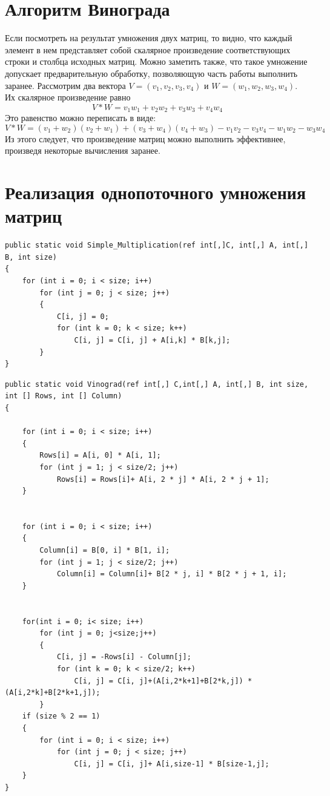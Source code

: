 \documentclass[a4paper,12pt]{article}
\begin{document}
\section{Алгоритм Винограда}
	Если посмотреть на результат умножения двух матриц, то видно, что каждый элемент в нем представляет собой скалярное произведение соответствующих строки и столбца исходных матриц. Можно заметить также, что такое умножение допускает предварительную обработку, позволяющую часть работы выполнить заранее. Рассмотрим два вектора $V = (v_1,v_2,v_3,v_4)$ и $W = (w_1,w_2,w_3,w_4)$. Их скалярное произведение равно 
	\begin{equation}
		V*W = v_1w_1 + v_2w_2 + v_3w_3 + v_4w_4
	\end{equation}
	Это равенство можно переписать в виде:
	\begin{equation}
	V*W = (v_1+w_2)(v_2+w_1)+(v_3+w_4)(v_4+w_3)-v_1v_2-v_3v_4-w_1w_2-w_3w_4
	\end{equation}
	Из этого следует, что произведение матриц можно выполнить эффективнее, произведя некоторые вычисления заранее.
	
    
\section{Реализация однопоточного умножения матриц}
\begin{lstlisting}[label=some-code,caption={Стандартный алгоритм умножения матриц}]
public static void Simple_Multiplication(ref int[,]C, int[,] A, int[,] B, int size)
{
	for (int i = 0; i < size; i++)
		for (int j = 0; j < size; j++)
		{
			C[i, j] = 0;
			for (int k = 0; k < size; k++)
				C[i, j] = C[i, j] + A[i,k] * B[k,j];
		}
}
\end{lstlisting}

\begin{lstlisting}[label=some-code1,caption={Алгоритм Винограда}]
public static void Vinograd(ref int[,] C,int[,] A, int[,] B, int size, int [] Rows, int [] Column)
{
	
	for (int i = 0; i < size; i++)
	{
		Rows[i] = A[i, 0] * A[i, 1];
		for (int j = 1; j < size/2; j++)
			Rows[i] = Rows[i]+ A[i, 2 * j] * A[i, 2 * j + 1];
	}
	
	
	for (int i = 0; i < size; i++)
	{
		Column[i] = B[0, i] * B[1, i];
		for (int j = 1; j < size/2; j++)
			Column[i] = Column[i]+ B[2 * j, i] * B[2 * j + 1, i];
	}
	
	
	for(int i = 0; i< size; i++)
		for (int j = 0; j<size;j++)
		{
			C[i, j] = -Rows[i] - Column[j];
			for (int k = 0; k < size/2; k++)
				C[i, j] = C[i, j]+(A[i,2*k+1]+B[2*k,j]) * (A[i,2*k]+B[2*k+1,j]);
		}
	if (size % 2 == 1)
	{
		for (int i = 0; i < size; i++)
			for (int j = 0; j < size; j++)
				C[i, j] = C[i, j]+ A[i,size-1] * B[size-1,j];
	}
}
\end{lstlisting}
\end{document}
